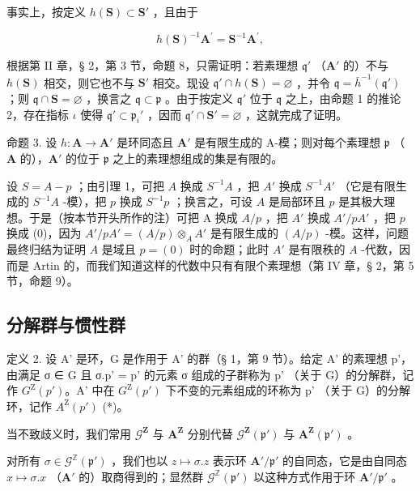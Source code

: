 事实上，按定义 \(h(\mathbf{S}) \subset \mathbf{S}'\) ，且由于

\[
h (\mathbf {S}) ^ {- 1} \mathbf {A} ^ {\prime} = \mathbf {S} ^ {- 1} \mathbf {A} ^ {\prime},
\]

根据第 II 章，§ 2，第 3 节，命题 8，只需证明：若素理想 \(\mathfrak{q}'\) （\(\mathbf{A}'\) 的）不与 \(h(\mathbf{S})\) 相交，则它也不与 \(\mathbf{S}'\) 相交。现设 \(\mathfrak{q}' \cap h(\mathbf{S}) = \varnothing\) ，并令 \(\mathfrak{q} = \bar{h}^{-1}(\mathfrak{q}')\) ；则 \(\mathfrak{q} \cap \mathbf{S} = \varnothing\) ，换言之 \(\mathfrak{q} \subset \mathfrak{p}\) 。由于按定义 \(\mathfrak{q}'\) 位于 \(\mathfrak{q}\) 之上，由命题 1 的推论 2，存在指标 \(\iota\) 使得 \(\mathfrak{q}' \subset \mathfrak{p}_i'\) ，因而 \(\mathfrak{q}' \cap \mathbf{S}' = \varnothing\) ，这就完成了证明。

命题 3. 设 \(h: \mathbf{A} \to \mathbf{A}'\) 是环同态且 \(\mathbf{A}'\) 是有限生成的 A-模；则对每个素理想 \(\mathfrak{p}\) （\(\mathbf{A}\) 的），\(\mathbf{A}'\) 的位于 \(\mathfrak{p}\) 之上的素理想组成的集是有限的。

设 \(S = A - p\) ；由引理 1，可把 \(A\) 换成 \(S^{-1}A\) ，把 \(A'\) 换成 \(S^{-1}A'\) （它是有限生成的 \(S^{-1}A\) -模），把 \(p\) 换成 \(S^{-1}p\) ；换言之，可设 \(A\) 是局部环且 \(p\) 是其极大理想。于是（按本节开头所作的注）可把 A 换成 \(A/p\) ，把 \(A'\) 换成 \(A'/pA'\) ，把 \(p\) 换成 (0)，因为 \(A'/pA' = (A/p) \otimes_A A'\) 是有限生成的 \((A/p)\) -模。这样，问题最终归结为证明 \(A\) 是域且 \(p = (0)\) 时的命题；此时 \(A'\) 是有限秩的 \(A\) -代数，因而是 Artin 的，而我们知道这样的代数中只有有限个素理想（第 IV 章，§ 2，第 5 节，命题 9）。

\subsection{分解群与惯性群}

定义 2. 设 A' 是环，G 是作用于 A' 的群（§ 1，第 9 节）。给定 A' 的素理想 p'，由满足 σ ∈ G 且 σ.p' = p' 的元素 σ 组成的子群称为 p' （关于 G）的分解群，记作 \(G^{\mathrm{Z}}(p')\)。A' 中在 \(G^{\mathrm{Z}}(p')\) 下不变的元素组成的环称为 p' （关于 G）的分解环，记作 \(A^{\mathrm{Z}}(p')\) (*)。

  当不致歧义时，我们常用 \(\mathcal{G}^{\mathbf{Z}}\) 与 \(\mathbf{A}^{\mathbf{Z}}\) 分别代替 \(\mathcal{G}^{\mathbf{Z}}(\mathfrak{p}')\) 与 \(\mathbf{A}^{\mathbf{Z}}(\mathfrak{p}')\) 。

对所有 \(\sigma \in \mathcal{G}^{\mathbb{Z}}(\mathfrak{p}')\) ，我们也以 \(z \mapsto \sigma.z\) 表示环 \(\mathbf{A}' / \mathfrak{p}'\) 的自同态，它是由自同态 \(x \mapsto \sigma.x\) （\(\mathbf{A}'\) 的）取商得到的；显然群 \(\mathcal{G}^{\mathbb{Z}}(\mathfrak{p}')\) 以这种方式作用于环 \(\mathbf{A}' / \mathfrak{p}'\) 。

